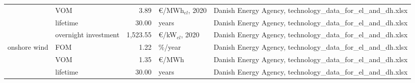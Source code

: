 \begin{longtable}{p{4cm}p{4cm}rp{3cm}p{10cm}}
                      & VOM &         3.89 &        \euro/MWh$_{el}$, 2020 &                                                                                                                                                                                                                                                                        Danish Energy Agency, technology\_data\_for\_el\_and\_dh.xlsx \\
                      & lifetime &        30.00 &                         years &                                                                                                                                                                                                                                                                        Danish Energy Agency, technology\_data\_for\_el\_and\_dh.xlsx \\
                      & overnight investment &     1,523.55 &         \euro/kW$_{el}$, 2020 &                                                                                                                                                                                                                                                                        Danish Energy Agency, technology\_data\_for\_el\_and\_dh.xlsx \\
onshore wind & FOM &         1.22 &                       \%/year &                                                                                                                                                                                                                                                                        Danish Energy Agency, technology\_data\_for\_el\_and\_dh.xlsx \\
                      & VOM &         1.35 &                     \euro/MWh &                                                                                                                                                                                                                                                                        Danish Energy Agency, technology\_data\_for\_el\_and\_dh.xlsx \\
                      & lifetime &        30.00 &                         years &                                                                                                                                                                                                                                                                        Danish Energy Agency, technology\_data\_for\_el\_and\_dh.xlsx \\

\end{longtable}

